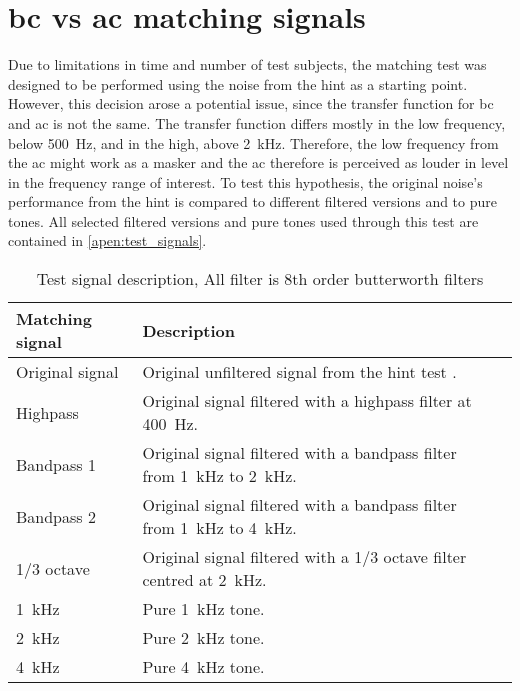 \chapter{\gls{bc} vs \gls{ac} matching signals}
\label{apend_matching_signals}
Due to limitations in time and number of test subjects, the matching test was designed to be performed using the noise from the \gls{hint} as a starting point. However, this decision arose a potential issue, since the transfer function for \gls{bc} and \gls{ac} is not the same. The transfer function differs mostly in the low frequency, below \SI{500}{\hertz}, and in the high, above \SI{2}{\kilo\hertz}. Therefore, the low frequency from the \gls{ac} might work as a masker and the \gls{ac} therefore is perceived as louder in level in the frequency range of interest. To test this hypothesis, the original noise's performance from the \gls{hint} is compared to different filtered versions and to pure tones. All selected filtered versions and pure tones used through this test are contained in \autoref{apen:test_signals}. 


\begin{table}[H]
\caption{Test signal description, All filter is 8th order butterworth filters}
\begin{tabularx}{\textwidth}{l | X l}
Matching signal       & Description \\ \hline
Original signal         & Original unfiltered signal from the \gls{hint} test \citep{hint_2011}.      \\
Highpass        & Original signal filtered with a highpass filter at \SI{400}{\hertz}.           \\
Bandpass 1        & Original signal filtered with a bandpass filter from \SI{1}{\kilo\hertz} to \SI{2}{\kilo\hertz}.           \\
Bandpass 2        & Original signal filtered with a bandpass filter from \SI{1}{\kilo\hertz} to \SI{4}{\kilo\hertz}.          \\
1/3 octave & Original signal filtered with a 1/3 octave filter centred at \SI{2}{\kilo\hertz}.          \\
\SI{1}{\kilo\hertz}                  & Pure \SI{1}{\kilo\hertz} tone.      \\
\SI{2}{\kilo\hertz}                 & Pure \SI{2}{\kilo\hertz} tone.          \\
\SI{4}{\kilo\hertz}                 & Pure \SI{4}{\kilo\hertz} tone.        
\end{tabularx}
\label{apen:test_signals}
\end{table}

